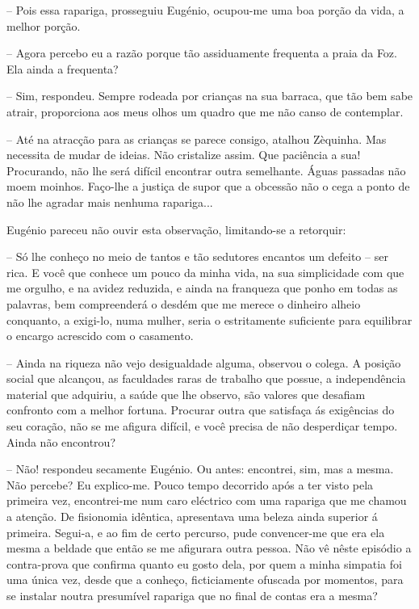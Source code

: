 \documentclass[9pt]{article}
\begin{document}
-- Pois essa rapariga, prosseguiu Eugé\-nio, ocupou-me uma boa por\-ção da vida, a me\-lhor por\-ção.

-- Agora percebo eu a razão porque tão assiduamente frequenta a praia
da Foz. Ela ainda a frequenta?

-- Sim, respondeu. Sempre rodeada por crian\-ças na sua barraca, que tão bem
sabe atrair, proporciona aos meus o\-lhos um quadro que me não canso de
contemplar.

-- Até na atrac\-ção para as crian\-ças se parece consigo, ata\-lhou Zèquinha.
Mas necessita de mudar de ideias. Não cristalize assim. Que paciência a
sua! Procurando, não lhe será difícil encontrar outra seme\-lhante. Águas
passadas não moem moinhos. Faço-\-lhe a justiça de supor que a obcessão
não o cega a ponto de não lhe agradar mais nenhuma rapariga...

Eugé\-nio pareceu não ouvir esta observa\-ção, limitando-se a retorquir:

-- Só lhe conheço no meio de tantos e tão sedutores encantos um defeito -- ser rica. E você que conhece um pouco da minha vida, na sua simplicidade com que me orgu\-lho, e na avidez reduzida, e ainda na franqueza que ponho em todas as palavras, bem compreenderá o desdém que me merece o dinheiro a\-lheio conquanto, a exigi-lo, numa mu\-lher, seria o estritamente suficiente
para equilibrar o encargo acrescido com o casamento.

-- Ainda na riqueza não vejo desigualdade alguma, observou o colega. A
posi\-ção social que alcançou, as faculdades raras de traba\-lho que possue, a
independên\-cia material que adquiriu, a saúde que lhe observo, são valores
que desafiam confronto com a me\-lhor fortuna. Procurar outra que satisfaça
ás exi\-gên\-cias do seu cora\-ção, não se me afigura difícil, e você precisa de não
des\-per\-di\-çar tempo. Ainda não encontrou?

-- Não! respondeu secamente Eugé\-nio. Ou antes: encontrei, sim, mas a
mesma. Não percebe? Eu explico-me. Pouco tempo decorrido após a ter visto
pela primeira vez, encontrei-me num caro eléctrico com uma rapariga que me
chamou a aten\-ção. De fisionomia idêntica, apresentava uma beleza ainda superior á primeira. Segui-a, e ao fim de certo percurso, pude convencer-me
que era ela mesma a beldade que então se me afigurara outra pessoa. Não
vê nês\-te episódio a contra-prova que confirma quanto eu gosto dela, por quem
a minha simpatia foi uma única vez, desde que a conheço, ficticiamente ofuscada por momentos, para se instalar noutra presumível rapariga que no final
de contas era a mesma?
\end{document}
